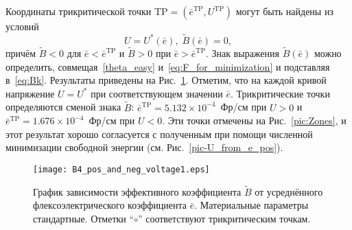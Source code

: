 Координаты трикритической точки $\mathrm{TP}=\left(\bar{e}^\mathrm{TP}, U^\mathrm{TP}\right)$ могут быть найдены из условий
\begin{equation}
U=U^*(\bar{e} ),\; \tilde{B}(\bar{e} )=0,
\end{equation}
причём $\tilde{B}<0$ для $\bar{e}<\bar{e}^\mathrm{TP}$ и $\tilde{B}>0$ при $\bar{e}>\bar{e}^\mathrm{TP}$.
Знак выражения $\tilde{B}(\bar{e})$ можно определить, совмещая~\eqref{theta_easy} и~\eqref{eq:F_for_minimization} и подставляя в~\eqref{eq:Bk}.
Результаты приведены на Рис.~\ref{pic:Landau}.
Отметим, что на каждой кривой напряжение $U = U^*$ при соответствующем значении $\bar{e}$.
Трикритические точки определяются сменой знака $\tilde{B}$: $\bar{e}^\mathrm{TP}=5.132\times10^{-4}$~Фр/см при $U>0$ и $\bar{e}^\mathrm{TP}=1.676\times10^{-4}$~Фр/см при $U<0$.
Эти точки отмечены на Рис.~\ref{pic:Zones}, и этот результат хорошо согласуется с полученным при помощи численной минимизации свободной энергии (см. Рис.~\ref{pic-U_from_e_pos}).
\begin{figure}
	\centering
	\texttt{[image: B4\_pos\_and\_neg\_voltage1.eps]}
	\caption{График зависимости эффективного коэффициента $\tilde{B}$ от усреднённого флексоэлектрического коэффициента $\bar{e}$.
		Материальные параметры стандартные.
		Отметки ``$\circ$'' соответствуют трикритическим точкам.
	}
	\label{pic:Landau}
\end{figure}